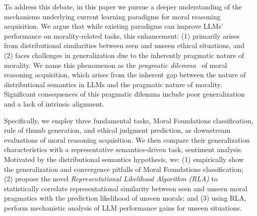 To address this debate, in this paper we pursue a deeper understanding of the mechanisms underlying current learning paradigms for moral reasoning acquisition. We argue that while existing paradigms can improve LLMs’ performance on morality-related tasks, this enhancement: (1) primarily arises from distributional similarities between seen and unseen ethical situations, and (2) faces challenges in generalization due to the inherently pragmatic nature of morality.
We name this phenomenon as the \textit{pragmatic dilemma}~\cite{laverick2010ethical,sap2022neural} of moral reasoning acquisition, which arises from the inherent gap between the nature of distributional semantics in LLMs and the pragmatic nature of morality. Significant consequences of this pragmatic dilemma include poor generalization and a lack of intrinsic alignment.

Specifically, we employ three fundamental tasks, Moral Foundations classification, rule of thumb generation, and ethical judgment prediction, as downstream evaluations of moral reasoning acquisition. We then compare their generalization characteristics with a representative semantics-driven task, sentiment analysis.
Motivated by the distributional semantics hypothesis, we:
(1) empirically show the generalization and convergence pitfalls of Moral Foundations classification; (2) propose the novel \textit{Representational Likelihood Algorithm (RLA)} to statistically correlate representational similarity between seen and unseen moral pragmatics with the prediction likelihood of unseen morals; and
(3) using RLA, perform mechanistic analysis of LLM performance gains for unseen situations.

